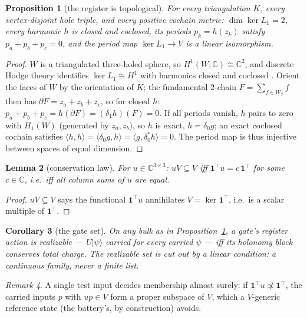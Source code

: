 \documentclass[a4paper,twocolumn,11pt,unpublished]{quantumarticle}
\theoremstyle{plain}
\newtheorem{proposition}{Proposition}
\newtheorem{lemma}[proposition]{Lemma}
\newtheorem{corollary}[proposition]{Corollary}
\theoremstyle{remark}
\newtheorem{remark}[proposition]{Remark}
\newcommand{\ket}[1]{|#1\rangle}
\newcommand{\kerL}{\ker L}
\begin{document}
\begin{proposition}[the register is topological]
\label{prop:register}
For every triangulation $K$, every vertex-disjoint hole triple, and every
positive cochain metric: $\dim\kerL_1=2$, every harmonic $h$ is closed
and coclosed, its periods $p_k=h(z_k)$ satisfy $p_a+p_b+p_c=0$, and the
period map $\kerL_1\to V$ is a linear isomorphism.
\end{proposition}

\begin{proof}
$W$ is a triangulated three-holed sphere, so $H^1(W;\mathbb{C})\cong
\mathbb{C}^2$, and discrete Hodge theory identifies $\kerL_1\cong H^1$
with harmonics closed and coclosed
\cite{Eckmann1945Harmonische,Lim2020HodgeLaplacians}. Orient the faces
of $W$ by the orientation of $K$; the fundamental $2$-chain
$F=\sum_{f\in W_2}f$ then has $\partial F=z_a+z_b+z_c$, so for closed
$h$: $p_a+p_b+p_c=h(\partial F)=(\delta_1 h)(F)=0$. If all periods
vanish, $h$ pairs to zero with $H_1(W)$ (generated by $z_a,z_b$), so $h$
is exact, $h=\delta_0 g$; an exact coclosed cochain satisfies
$\langle h,h\rangle=\langle\delta_0 g,h\rangle=
\langle g,\delta_0^* h\rangle=0$. The period map is thus injective
between spaces of equal dimension.
\end{proof}

\begin{lemma}[conservation law]
\label{lem:criterion}
For $u\in\mathbb{C}^{3\times3}$: $uV\subseteq V$ iff
$\mathbf{1}^\top u=c\,\mathbf{1}^\top$ for some $c\in\mathbb{C}$, i.e.\
iff all column sums of $u$ are equal.
\end{lemma}

\begin{proof}
$uV\subseteq V$ says the functional $\mathbf{1}^\top u$ annihilates
$V=\ker\mathbf{1}^\top$, i.e.\ is a scalar multiple of
$\mathbf{1}^\top$.
\end{proof}

\begin{corollary}[the gate set]
\label{cor:gateset}
On any bulk as in Proposition~\ref{prop:register}, a gate's register
action is realizable --- $U\ket{\psi}$ carried for every carried $\psi$
--- iff its holonomy block conserves total charge. The realizable set is
cut out by a linear condition: a continuous family, never a finite list.
\end{corollary}

\begin{remark}
\label{rem:generic}
A single test input decides membership almost surely: if
$\mathbf{1}^\top u\not\propto\mathbf{1}^\top$, the carried inputs $p$
with $up\in V$ form a proper subspace of $V$, which a $V$-generic
reference state (the battery's, by construction) avoids.
\end{remark}
\end{document}
